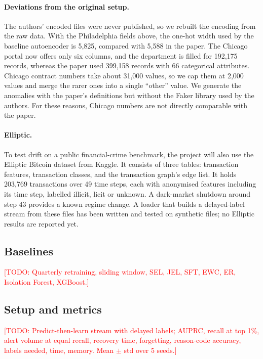 \documentclass{article} %
\newcommand{\todo}[1]{\textcolor{red}{[TODO: #1]}}
\begin{document}
\paragraph{Deviations from the original setup.}
The authors' encoded files were never published, so we rebuilt the encoding
from the raw data. With the Philadelphia fields above, the one-hot width used
by the baseline autoencoder is 5{,}825, compared with 5{,}588 in the paper. The
Chicago portal now offers only six columns, and the department is filled for
192{,}175 records, whereas the paper used 399{,}158 records with 66 categorical
attributes. Chicago contract numbers take about 31{,}000 values, so we cap them
at 2{,}000 values and merge the rarer ones into a single ``other'' value. We generate the anomalies with the paper's definitions but
without the Faker library used by the authors. For these reasons, Chicago
numbers are not directly comparable with the paper.

\paragraph{Elliptic.}
To test drift on a public financial-crime benchmark, the project will also use
the Elliptic Bitcoin dataset \citep{weber2019elliptic} from Kaggle. It
consists of three tables: transaction features, transaction classes, and the
transaction graph's edge list. It holds 203{,}769 transactions over 49 time
steps, each with anonymised features including its time step, labelled
illicit, licit or unknown. A dark-market shutdown around step 43 provides a
known regime change. A loader that builds a delayed-label stream from these
files has been written and tested on synthetic files; no Elliptic results are
reported yet.
\subsection{Baselines}
\todo{Quarterly retraining, sliding window, SEL, JEL, SFT, EWC, ER, Isolation Forest, XGBoost.}
\subsection{Setup and metrics}
\todo{Predict-then-learn stream with delayed labels; AUPRC, recall at top 1\%,
alert volume at equal recall, recovery time, forgetting, reason-code accuracy,
labels needed, time, memory. Mean $\pm$ std over 5 seeds.}
\end{document}

